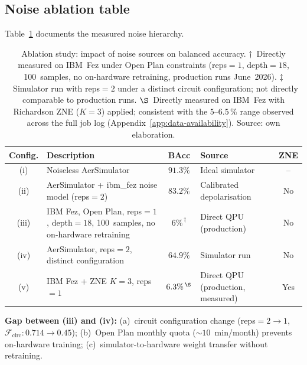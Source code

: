 \documentclass[11pt,a4paper, english]{book}
\theoremstyle{plain}
\theoremstyle{definition}
\numberwithin{equation}{chapter}
\numberwithin{figure}{chapter}
\numberwithin{table}{chapter}
\begin{document}
\subsection{Noise ablation table}

Table~\ref{tab:ablation_noise} documents the measured noise hierarchy.

\begin{table}[h]
\centering
\begin{tabular}{@{}c p{5.5cm} c p{3cm} c@{}}
\toprule
\textbf{Config.} & \textbf{Description} & \textbf{BAcc} &
\textbf{Source} & \textbf{ZNE}\\
\midrule
(i)   & Noiseless AerSimulator
      & $91.3\%$
      & Ideal simulator
      & -- \\
(ii)  & AerSimulator + ibm\_fez noise model (reps$=2$)
      & $83.2\%$
      & Calibrated depolarisation
      & No \\
(iii) & IBM Fez, Open Plan, reps$=1$, depth$=18$,
        100~samples, no on-hardware retraining
      & $6\%^{\,\dagger}$
      & Direct QPU (production)
      & No \\
(iv)  & AerSimulator, reps$=2$, distinct configuration
      & $64.9\%$
      & Simulator run
      & No \\
(v)   & IBM Fez + ZNE $K=3$, reps$=1$
      & $6.3\%^{\,\S}$
      & Direct QPU (production, measured)
      & Yes \\
\bottomrule
\end{tabular}
\caption[Ablation study of noise sources on accuracy]{Ablation study:
         impact of noise sources on balanced accuracy.
         $\dagger$~Directly measured on IBM~Fez under Open Plan
         constraints (reps$=1$, depth$=18$, 100~samples, no
         on-hardware retraining, production runs June~2026).
         $\ddagger$~Simulator run with reps$=2$ under a distinct circuit 
configuration; not directly comparable to production runs.
         $\S$~Directly measured on IBM~Fez with Richardson ZNE ($K=3$) applied;
consistent with the $5$--$6.5\,\%$ range observed across the full job
log (Appendix~\ref{app:data-availability}). Source: own elaboration.}
\label{tab:ablation_noise}
\vspace{2pt}
\normalsize

\par\smallskip
\noindent\footnotesize
\textbf{Gap between (iii) and (iv):}
(a)~circuit configuration change (reps$=2\to1$, $\mathcal{F}_\mathrm{circ}:0.714\to0.45$);
(b)~Open Plan monthly quota (${\sim}10$~min/month) prevents on-hardware training;
(c)~simulator-to-hardware weight transfer without retraining.
\end{table}
\end{document}
